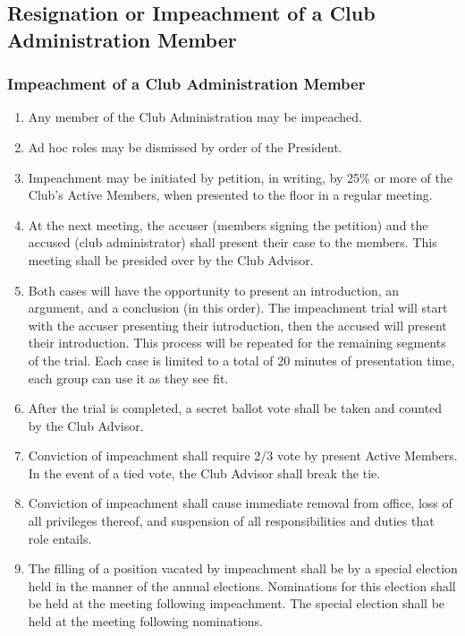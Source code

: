 \documentclass[english,11pt]{article}
\begin{document}
\subsection{Resignation or Impeachment of a Club Administration Member} \label{sect:cadmin:removal}

\subsubsection{Impeachment of a Club Administration Member} \label{subsect:cadmin:removal:impeachment}

\begin{enumerate}[label=\alph*.]
    \item Any member of the Club Administration may be impeached.
    \item Ad hoc roles may be dismissed by order of the President.
    \item Impeachment may be initiated by petition, in writing, by 25\% or more of the Club's Active Members, when presented to the floor in a regular meeting.
    \item At the next meeting, the accuser (members signing the petition) and the accused (club administrator) shall present their case to the members.
        This meeting shall be presided over by the Club Advisor.
    \item Both cases will have the opportunity to present an introduction, an argument, and a conclusion (in this order).
        The impeachment trial will start with the accuser presenting their introduction, then the accused will present their introduction.
        This process will be repeated for the remaining segments of the trial.
        Each case is limited to a total of 20 minutes of presentation time, each group can use it as they see fit.
    \item After the trial is completed, a secret ballot vote shall be taken and counted by the Club Advisor.
    \item Conviction of impeachment shall require 2/3 vote by present Active Members.
        In the event of a tied vote, the Club Advisor shall break the tie.
    \item Conviction of impeachment shall cause immediate removal from office, loss of all privileges thereof, and suspension of all responsibilities and duties that role entails.
    \item The filling of a position vacated by impeachment shall be by a special election held in the manner of the annual elections.
        Nominations for this election shall be held at the meeting following impeachment.
        The special election shall be held at the meeting following nominations.
\end{enumerate}
\end{document}
